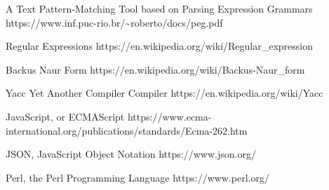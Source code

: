 \begin{thebibliography}{12}

  A Text Pattern-Matching Tool based on Parsing Expression Grammars
  https://www.inf.puc-rio.br/\textasciitilde roberto/docs/peg.pdf

  Regular Expressions
  https://en.wikipedia.org/wiki/Regular\_expression

  Backus Naur Form
  https://en.wikipedia.org/wiki/Backus-Naur\_form

  Yacc Yet Another Compiler Compiler
  https://en.wikipedia.org/wiki/Yacc

  JavaScript, or ECMAScript
  https://www.ecma-international.org/publications/standards/Ecma-262.htm

  JSON, JavaScript Object Notation
  https://www.json.org/

  Perl, the Perl Programming Language
  https://www.perl.org/

\end{thebibliography}
